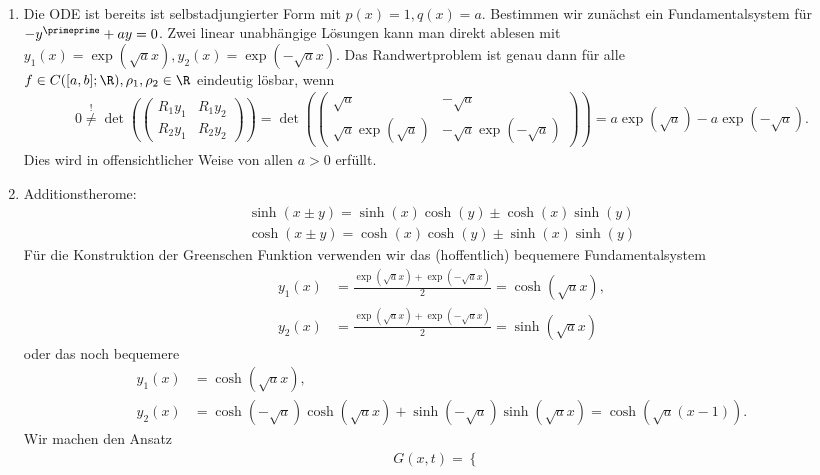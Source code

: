 \begin{solution}
\leavevmode \\
\begin{enumerate}[label = \textbf{\alph*)}]
  \item Die ODE ist bereits ist selbstadjungierter Form mit $p(x) = 1, q(x) = a$.
  Bestimmen wir zunächst ein Fundamentalsystem für $-y^{\primeprime} + ay = 0$.
  Zwei linear unabhängige Lösungen kann man direkt ablesen mit $y_1(x) = \exp(\sqrt{a}x), y_2(x) = \exp(-\sqrt{a}x)$.
  Das Randwertproblem ist genau dann für alle \\
  $f \in C([a,b];\R), \rho_1,\rho_2 \in \R$
  eindeutig lösbar, wenn
  \begin{align*}
    0 \stackrel{!}{\neq} \det\left(\begin{pmatrix}
      R_1y_1 & R_1y_2 \\ R_2y_1 & R_2y_2
    \end{pmatrix}\right) =
    \det\left(\begin{pmatrix}
      \sqrt{a} & -\sqrt{a} \\ \sqrt{a}\exp(\sqrt{a}) & -\sqrt{a}\exp(-\sqrt{a})
    \end{pmatrix}\right)
    = a\exp(\sqrt{a}) - a\exp(-\sqrt{a}).
  \end{align*}
  Dies wird in offensichtlicher Weise von allen $a > 0$ erfüllt.
  \item Additionstherome:
  \begin{align}
    \sinh(x \pm y) = \sinh(x)\cosh(y) \pm \cosh(x)\sinh(y) \label{sinh} \\
    \cosh(x \pm y) = \cosh(x)\cosh(y) \pm \sinh(x)\sinh(y) \label{cosh}
  \end{align}
  Für die Konstruktion der Greenschen Funktion verwenden wir das (hoffentlich)
  bequemere Fundamentalsystem
  \begin{align*}
  y_1(x) &= \frac{\exp(\sqrt{a}x)+\exp(-\sqrt{a}x)}{2} = \cosh(\sqrt{a}x), \\
  y_2(x) &= \frac{\exp(\sqrt{a}x)+\exp(-\sqrt{a}x)}{2} = \sinh(\sqrt{a}x)
  \end{align*}
  oder das noch bequemere
  \begin{align*}
  y_1(x) &= \cosh(\sqrt{a}x), \\
  y_2(x) &= \cosh(-\sqrt{a})\cosh(\sqrt{a}x) + \sinh(-\sqrt{a})\sinh(\sqrt{a}x) =
  \cosh(\sqrt{a}(x-1)).
  \end{align*}
  Wir machen den Ansatz
  \begin{align*}
    G(x,t) = \begin{cases}

\end{cases}
\end{align*}
\end{enumerate}
\end{solution}
